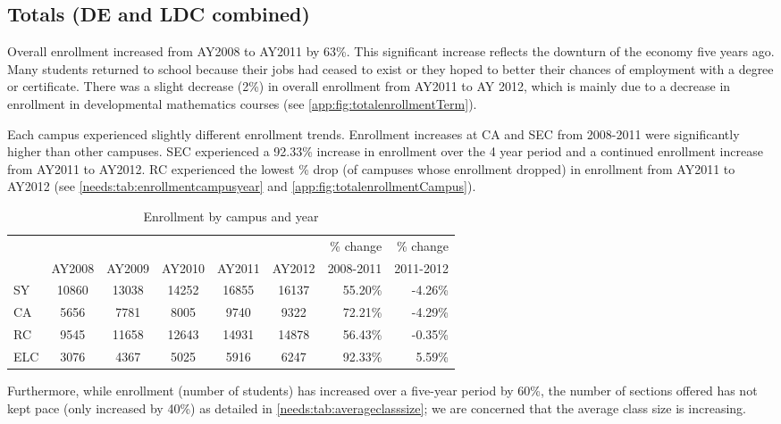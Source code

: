 \subsection{Totals (DE and LDC combined)}
Overall enrollment increased from AY2008 to AY2011 by 63\%. This significant
increase reflects the downturn of the economy five years ago. Many students
returned to school because their jobs had ceased to exist or they hoped to
better their chances of employment with a degree or certificate. There was a
slight decrease (2\%) in overall enrollment from AY2011 to AY 2012, which is
mainly due to a decrease in enrollment in developmental mathematics courses
(see \vref{app:fig:totalenrollmentTerm}).


Each campus experienced slightly different enrollment trends. Enrollment
increases at CA and SEC from 2008-2011 were significantly higher than other
campuses. SEC experienced a 92.33\% increase in enrollment over the 4 year
period and a continued enrollment increase from AY2011 to AY2012. RC
experienced the lowest \% drop (of campuses whose enrollment dropped)  in
enrollment from AY2011 to AY2012 (see \vref{needs:tab:enrollmentcampusyear} and
\vref{app:fig:totalenrollmentCampus}).

\begin{table}[!htb]
	\centering
	\caption{Enrollment by campus and year}
	\label{needs:tab:enrollmentcampusyear}
	\begin{tabular}{l*{5}{c}rr}
		\toprule
		    &        &        &        &        &        & \% change & \% change \\
		    & AY2008 & AY2009 & AY2010 & AY2011 & AY2012 & 2008-2011 & 2011-2012 \\
		\midrule
		SY  & 10860  & 13038  & 14252  & 16855  & 16137  & 55.20\%   & -4.26\%   \\
		CA  & 5656   & 7781   & 8005   & 9740   & 9322   & 72.21\%   & -4.29\%   \\
		RC  & 9545   & 11658  & 12643  & 14931  & 14878  & 56.43\%   & -0.35\%   \\
		ELC & 3076   & 4367   & 5025   & 5916   & 6247   & 92.33\%   & 5.59\%    \\
		\bottomrule
	\end{tabular}
\end{table}

Furthermore, while enrollment (number of students) has increased over a
five-year period by 60\%, the number of sections offered has not kept pace
(only increased by 40\%) as detailed in \cref{needs:tab:averageclasssize}; we
are concerned that the average class size is increasing.

